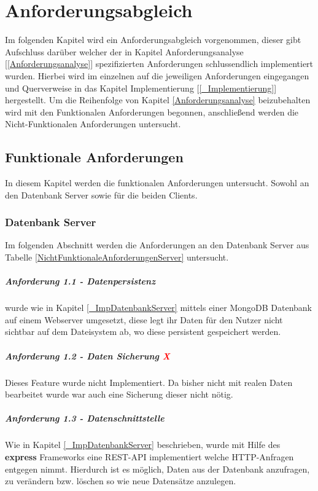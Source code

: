 \chapter{Anforderungsabgleich} \label{Anforderungsabgleich}
Im folgenden Kapitel wird ein Anforderungsabgleich vorgenommen, dieser gibt Aufschluss darüber welcher der in Kapitel Anforderungsanalyse [\ref{Anforderungsanalyse}] spezifizierten Anforderungen schlussendlich implementiert wurden.
Hierbei wird im einzelnen auf die jeweiligen Anforderungen eingegangen und Querverweise in das Kapitel Implementierung [\ref{_Implementierung}] hergestellt. Um die Reihenfolge von Kapitel \ref{Anforderungsanalyse} beizubehalten wird mit den Funktionalen Anforderungen begonnen, anschließend werden die Nicht-Funktionalen Anforderungen untersucht.
\section{Funktionale Anforderungen}
In diesem Kapitel werden die funktionalen Anforderungen untersucht. Sowohl an den Datenbank Server sowie für die beiden Clients.
\subsection{Datenbank Server}
Im folgenden Abschnitt werden die Anforderungen an den Datenbank Server aus Tabelle \ref{NichtFunktionaleAnforderungenServer} untersucht.
\paragraph{Anforderung 1.1 - Datenpersistenz  \textcolor{green}{\checkmark}}
 wurde wie in Kapitel \ref{_ImpDatenbankServer} mittels einer MongoDB Datenbank auf einem Webserver umgesetzt, diese legt ihr Daten für den Nutzer nicht sichtbar auf dem Dateisystem ab, wo diese persistent gespeichert werden.

\paragraph{Anforderung 1.2 - Daten Sicherung  \textcolor{red}{X}}
Dieses Feature wurde nicht Implementiert. Da bisher nicht mit realen Daten bearbeitet wurde war auch eine Sicherung dieser nicht nötig.

\paragraph{Anforderung 1.3 - Datenschnittstelle \textcolor{green}{\checkmark}}
Wie in Kapitel \ref{_ImpDatenbankServer} beschrieben, wurde mit Hilfe des \textbf{express} Frameworks eine REST-API implementiert welche HTTP-Anfragen entgegen nimmt. Hierdurch ist es möglich, Daten aus der Datenbank anzufragen, zu verändern bzw. löschen so wie neue Datensätze anzulegen.


